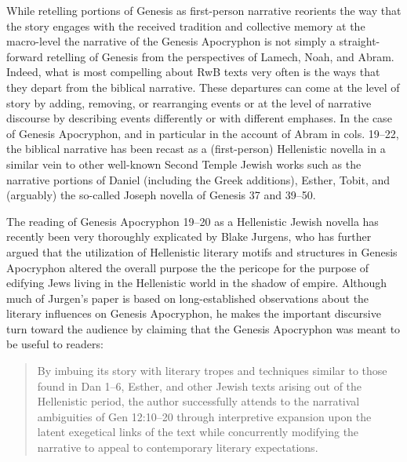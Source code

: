 While retelling portions of Genesis as first-person narrative reorients
the way that the story engages with the received tradition and
collective memory at the macro-level the narrative of the
Genesis Apocryphon is not simply a straight-forward retelling of Genesis
from the perspectives of Lamech, Noah, and Abram. Indeed, what is most
compelling about RwB texts very often is the ways that they depart from
the biblical narrative. These departures can come at the level of story
by adding, removing, or rearranging events or at the level of narrative
discourse by describing events differently or with different emphases.
In the case of Genesis Apocryphon, and in particular in the account of
Abram in cols. 19--22, the biblical narrative has been recast as a
(first-person) Hellenistic novella in a similar vein to other well-known
Second Temple Jewish works such as the narrative portions of Daniel
(including the Greek additions), Esther, Tobit, and (arguably) the
so-called Joseph novella of Genesis 37 and 39--50.\autocites*[See
especially Lawrence Wills work on the Jewish novels and novellas in
antiquity:][]{wills2002}[as well as his important earlier
works:][]{wills1995}[and][]{wills1990}

The reading of Genesis Apocryphon 19--20 as a Hellenistic Jewish novella
has recently been very thoroughly explicated by Blake Jurgens, who has
further argued that the utilization of Hellenistic literary motifs and
structures in Genesis Apocryphon altered the overall purpose the the
pericope for the purpose of edifying Jews living in the Hellenistic
world in the shadow of empire.\autocite{jurgens_jsj2018} Although much
of Jurgen's paper is based on long-established observations about the
literary influences on Genesis Apocryphon, he makes the important
discursive turn toward the audience by claiming that the
Genesis Apocryphon was meant to be useful to readers:

\begin{quote}
By imbuing its story with literary tropes and techniques similar to
those found in Dan 1--6, Esther, and other Jewish texts arising out of
the Hellenistic period, the author successfully attends to the
narratival ambiguities of Gen 12:10--20 through interpretive expansion
upon the latent exegetical links of the text while concurrently
modifying the narrative to appeal to contemporary literary
expectations.\autocite[27]{jurgens_jsj2018}
\end{quote}

